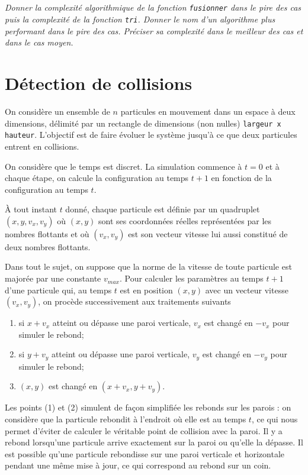 \documentclass[10pt,fleqn]{article} %
\begin{document}
\subparagraph{}
\textit{Donner la complexité algorithmique de la fonction \texttt{fusionner} dans le pire des cas puis la complexité de la fonction \texttt{tri}.
Donner le nom d'un algorithme plus performant dans le pire des cas. Préciser sa complexité dans le meilleur des cas et dans le cas moyen.}
\ifprof
\begin{corrige}

\end{corrige}
\else
\fi






\section*{Détection de collisions}

On considère un ensemble de $n$ particules en mouvement dans un espace à deux dimensions, délimité par un rectangle de dimensions (non nulles) \texttt{largeur x hauteur}. L'objectif est de faire évoluer le système jusqu'à ce que deux particules entrent en collisions.

On considère que le temps est discret. La simulation commence à $t=0$ et à chaque étape, on calcule la configuration au temps $t+1$ en fonction de la configuration au temps $t$. 

À tout instant $t$ donné, chaque particule est définie par un quadruplet $(x,y,v_x,v_y)$ où $(x,y)$ sont ses coordonnées réelles représentées par les nombres flottants et où $(v_x,v_y)$ est son vecteur vitesse lui aussi constitué de deux nombres flottants. 

Dans tout le sujet, on suppose que la norme de la vitesse de toute particule est majorée par une constante $v_{max}$. Pour calculer les paramètres au temps $t+1$ d'une particule qui, au temps $t$ est en position $(x,y)$ avec un vecteur vitesse $(v_x,v_y)$, on procède successivement aux traitements suivants %
\begin{enumerate}
\item si $x+v_x$ atteint ou dépasse une paroi verticale, $v_x$ est changé en $-v_x$ pour simuler le rebond;
\item si $y+v_y$ atteint ou dépasse une paroi verticale, $v_y$ est changé en $-v_y$ pour simuler le rebond;
\item $(x,y)$ est changé en $(x+v_x,y+v_y)$. 
\end{enumerate}
Les points (1) et (2) simulent de façon simplifiée les rebonds sur les parois : on considère que la particule rebondit à l'endroit où elle est au temps $t$, ce qui nous permet d'éviter de calculer le véritable point de collision avec la paroi. Il y a rebond lorsqu'une particule arrive exactement sur la paroi ou qu'elle la dépasse. Il est possible qu'une particule rebondisse sur une paroi verticale et horizontale pendant une même mise à jour, ce qui correspond au rebond sur un coin.
\end{document}
